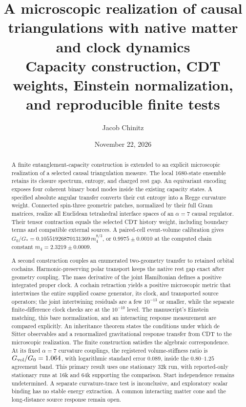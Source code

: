 \documentclass[11pt]{article}
\author{Jacob Chinitz}
\title{A microscopic realization of causal triangulations with native matter and clock dynamics\\[0.3em]
\large Capacity construction, CDT weights, Einstein normalization, and reproducible finite tests}
\date{November 22, 2026}
\theoremstyle{remark}
\newcommand{\Gstar}{G_*}
\numberwithin{equation}{section}
\begin{document}
\maketitle

\begin{abstract}
A finite entanglement-capacity construction is extended to an explicit microscopic realization of a selected causal triangulation measure. The local $1680$-state ensemble retains its closure spectrum, entropy, and charged rest gap. An equivariant encoding exposes four coherent binary bond modes inside the existing capacity states. A specified absolute angular transfer converts their cut entropy into a Regge curvature weight. Connected spin-three geometric patches, normalized by their full Gram matrices, realize all Euclidean tetrahedral interface spaces of an $\alpha=7$ causal regulator. Their tensor contraction equals the selected CDT history weight, including boundary terms and compatible external sources. A paired-cell event-volume calibration gives $G_0/\Gstar=0.10551926870131369\,m_4^{8/3}$, or $0.9975\pm0.0010$ at the computed chain constant $m_4=2.3219\pm0.0009$.

A second construction couples an enumerated two-geometry transfer to retained orbital cochains. Harmonic-preserving polar transport keeps the native rest gap exact after geometry coupling. The mass derivative of the joint Hamiltonian defines a positive integrated proper clock. A cochain retraction yields a positive microscopic metric that intertwines the entire supplied coarse generator, its clock, and transported source operators; the joint intertwining residuals are a few $10^{-13}$ or smaller, while the separate finite-difference clock checks are at the $10^{-10}$ level. The manuscript's Einstein matching, this bare normalization, and an interacting response measurement are compared explicitly. An inheritance theorem states the conditions under which de Sitter observables and a renormalized gravitational response transfer from CDT to the microscopic realization. The finite construction satisfies the algebraic correspondence. At its fixed $\alpha=7$ curvature couplings, the registered volume-stiffness ratio is $G_{\rm vol}/G_0=1.064$, with logarithmic standard error $0.089$, inside the $0.80$--$1.25$ agreement band. This primary result uses one stationary 32k run, with reported-only stationary runs at 16k and 64k supporting the comparison. Start independence remains undetermined. A separate curvature-trace test is inconclusive, and exploratory scalar binding has no stable energy extraction. A common interacting matter cone and the long-distance source response remain open.
\end{abstract}
\end{document}
